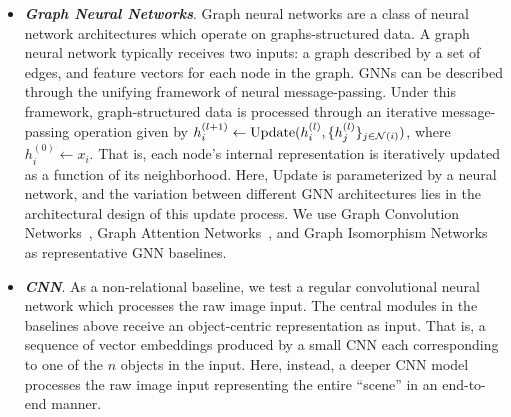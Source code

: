 \begin{itemize}
    \item \textbf{\textit{Graph Neural Networks}}. Graph neural networks are a class of neural network architectures which operate on graphs-structured data. A graph neural network typically receives two inputs: a graph described by a set of edges, and feature vectors for each node in the graph. GNNs can be described through the unifying framework of neural message-passing. Under this framework, graph-structured data is processed through an iterative message-passing operation given by $h_i^{(l+1)} \gets \mathrm{Update}(h_i^{(l)}, \{h_j^{(l)}\}_{j \in {\mathcal{N}}(i)})$, where $h_i^{(0)} \gets x_i$. That is, each node's internal representation is iteratively updated as a function of its neighborhood. Here, $\mathrm{Update}$ is parameterized by a neural network, and the variation between different GNN architectures lies in the architectural design of this update process. We use Graph Convolution Networks~\citep{kipfSemiSupervisedClassificationGraph2017}, Graph Attention Networks~\citep{velickovicGraphAttentionNetworks2017}, and Graph Isomorphism Networks~\citep{xuHowPowerfulAre2018} as representative GNN baselines.
    \item \textbf{\textit{CNN}}. As a non-relational baseline, we test a regular convolutional neural network which processes the raw image input. The central modules in the baselines above receive an object-centric representation as input. That is, a sequence of vector embeddings produced by a small CNN each corresponding to one of the $n$ objects in the input. Here, instead, a deeper CNN model processes the raw image input representing the entire ``scene'' in an end-to-end manner. 
\end{itemize}




